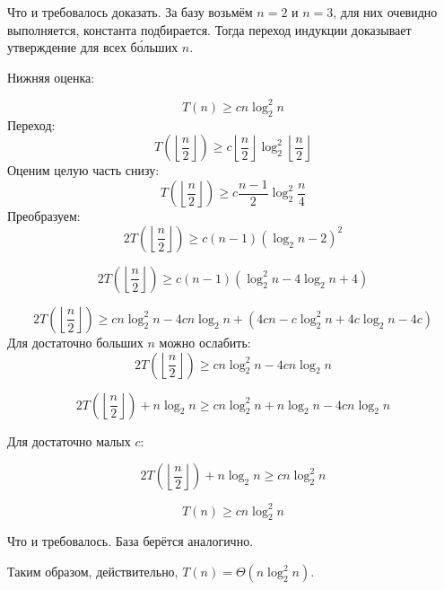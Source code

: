 \documentclass[11pt]{article}
\begin{document}
Что и требовалось доказать. За базу возьмём $n=2$ и $n=3$, для них очевидно выполняется, константа подбирается. Тогда переход индукции доказывает утверждение для всех б\'{о}льших $n$.

\pagebreak

Нижняя оценка:

\begin{equation}
	T\left(n\right) \geq  cn\log^2_2{n}
\end{equation}
Переход:
\begin{equation}
	T\left(\left\lfloor\frac{n}{2}\right\rfloor\right) \geq  c\left\lfloor\frac{n}{2}\right\rfloor\log^2_2{\left\lfloor\frac{n}{2}\right\rfloor}
\end{equation}
Оценим целую часть снизу:
\begin{equation}
	T\left(\left\lfloor\frac{n}{2}\right\rfloor\right) \geq  c \frac{n - 1}{2} \log^2_2{\frac{n}{4}}
\end{equation}
Преобразуем:
\begin{equation}
	2T\left(\left\lfloor\frac{n}{2}\right\rfloor\right) \geq  c \left(n - 1\right) \left(\log_2{n}-2\right)^2
\end{equation}

\begin{equation}
	2T\left(\left\lfloor\frac{n}{2}\right\rfloor\right) \geq  c \left(n - 1\right) \left(\log^2_2{n}-4\log_2{n}+4\right)
\end{equation}

\begin{equation}
	2T\left(\left\lfloor\frac{n}{2}\right\rfloor\right) \geq  cn\log^2_2{n}-4cn\log_2{n}+\left(4cn - c\log^2_2{n}+4c\log_2{n}-4c\right)
\end{equation}
Для достаточно больших $n$ можно ослабить:
\begin{equation}
	2T\left(\left\lfloor\frac{n}{2}\right\rfloor\right)
	\geq
	cn\log^2_2{n} - 4cn\log_2{n}
\end{equation}

\begin{equation}
	2T\left(\left\lfloor\frac{n}{2}\right\rfloor\right) + n\log_2{n}
	\geq
	cn\log^2_2{n} + n\log_2{n} - 4cn\log_2{n}
\end{equation}

Для достаточно малых $c$:

\begin{equation}
	2T\left(\left\lfloor\frac{n}{2}\right\rfloor\right) + n\log_2{n}
	\geq
	cn\log^2_2{n}
\end{equation}

\begin{equation}
	T\left(n\right)
	\geq
	cn\log^2_2{n}
\end{equation}

Что и требовалось. База берётся аналогично.

Таким образом, действительно, $T(n) = \Theta(n\log^2_2{n})$.
\end{document}
